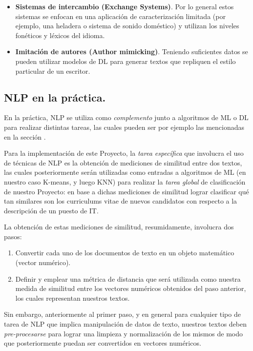 \documentclass[12pt,a4paper]{article}
\begin{document}
\begin{sloppypar}
\begin{itemize}
\item \textbf{Sistemas de intercambio (Exchange Systems)}. Por lo general estos sistemas se enfocan en una aplicación de caracterización limitada (por ejemplo, una heladera o sistema de sonido doméstico) y utilizan los niveles fonéticos y léxicos del idioma. 

\item \textbf{Imitación de autores (Author mimicking)}. Teniendo suficientes datos se pueden utilizar modelos de DL para generar textos que repliquen el estilo particular de un escritor.
\end{itemize}

\cleardoublepage

\subsection{NLP en la práctica.}\label{Practica_NLP}

En la práctica, NLP se utiliza como \textit{complemento} junto a algoritmos de ML o DL para realizar distintas tareas, las cuales pueden ser por ejemplo las mencionadas en la sección  \textit{}.

Para la implementación de este Proyecto, la \textit{tarea específica} que involucra el uso de técnicas de NLP es la obtención de mediciones de similitud entre dos textos, las cuales posteriormente serán utilizadas como entradas a algoritmos de ML (en nuestro caso K-means, y luego KNN) para realizar la \textit{tarea global} de clasificación de nuestro Proyecto: en base a dichas mediciones de similitud lograr clasificar qué tan similares son los curriculums vitae de nuevos candidatos con respecto a la descripción de un puesto de IT.

La obtención de estas mediciones de similitud, resumidamente, involucra dos pasos\cite{Similarity_calculation}:
\begin{enumerate}
\item Convertir cada uno de los documentos de texto en un objeto matemático (vector numérico).
\item Definir y emplear una métrica de distancia que será utilizada como nuestra medida de similitud entre los vectores numéricos obtenidos del paso anterior, los cuales representan nuestros textos.
\end{enumerate}

Sin embargo, anteriormente al primer paso, y en general para cualquier tipo de tarea de NLP que implica manipulación de datos de texto, nuestros textos deben \textit{pre-procesarse} para lograr una limpieza y normalización de los mismos de modo que posteriormente puedan ser convertidos en vectores numéricos\cite{NLP_2}.


\end{sloppypar}
\end{document}
